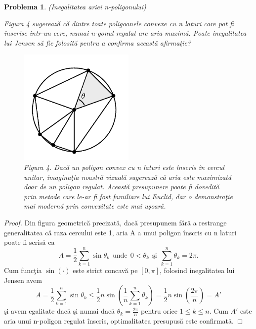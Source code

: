 \documentclass[a4paper,12pt,oneside]{report}
\newtheorem{problem}{Problema}
\begin{document}
\begin{problem} (Inegalitatea ariei n-poligonului)

Figura 4 sugereaz\u{a} c\u{a}  dintre toate poligoanele convexe cu n laturi care pot fi \^{i}nscrise \^{i}ntr-un cerc, numai n-gonul regulat are aria maxim\u{a}. Poate inegalitatea lui Jensen s\u{a} fie folosit\u{a} pentru a confirma aceast\u{a} afirma\c{t}ie?

\begin{figure}[htbp]
	\centering
	\includegraphics[width=0.5\textwidth]{fig_pb6.png}
	\caption{Figura 4. Dac\u{a} un poligon convex cu n laturi este \^{i}nscris \^{i}n cercul unitar, imagina\c{t}ia noastr\u{a} vizual\u{a} sugereaz\u{a} c\u{a} aria este maximizat\u{a} doar de un poligon regulat. Aceast\u{a} presupunere poate fi dovedit\u{a} prin metode care le-ar fi fost familiare lui Euclid, dar o demonstra\c{t}ie mai modern\u{a} prin convexitate este mai u\c{s}oar\u{a}.}
\end{figure}


\end{problem}
\begin{proof}
Din figura geometric\u{a} precizat\u{a}, dac\u{a} presupunem f\u{a}r\u{a} a restrange generalitatea c\u{a} raza cercului este 1, aria A a unui poligon \^{i}nscris cu n laturi poate fi scris\u{a} ca
\begin{displaymath}
  A = \frac{1}{2}\sum_{k = 1}^{n} \sin \theta _{k} ~~\text{unde} ~~0< \theta _{k} ~~\text{\c{s}i}~~ \sum_{k = 1}^n{\theta _{k}} = 2\pi.
\end{displaymath}
  Cum func\c{t}ia  \(\sin \left ( \cdot  \right )\) este strict concav\u{a} pe \(\left [ 0 , \pi  \right ]\), folosind inegalitatea lui Jensen avem
\begin{displaymath}
  A = \frac{1}{2}\sum_{k = 1}^{n} \sin \theta _{k}  \leq \frac{1}{2}n\sin\left ( \frac{1}{n}\sum_{k = 1}^{n}\theta _{k} \right ) = \frac{1}{2}n\sin \left ( \frac{2\pi }{n} \right ) = {A}'
\end{displaymath}
\c{s}i avem egalitate dac\u{a} \c{s}i numai dac\u{a} \(\theta _{k} = \frac{2\pi }{n}\) pentru orice \(1\leq k\leq n\). Cum \({A}'\) este aria unui n-poligon regulat \^{i}nscris, optimalitatea presupus\u{a} este confirmat\u{a}.
\end{proof}
\end{document}

